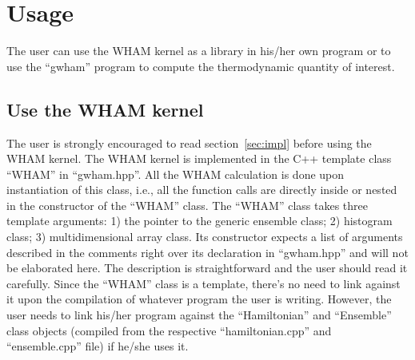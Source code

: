 \section{Usage}
The user can use the WHAM kernel as a library in his/her own
program or to use the ``gwham'' program to compute the thermodynamic
quantity of interest. 

\subsection{Use the WHAM kernel}
The user is strongly encouraged to read section~\ref{sec:impl} before using the
WHAM kernel. The WHAM kernel is implemented in the C++ template class ``WHAM''
in ``gwham.hpp''. All the WHAM calculation is done upon instantiation of this
class, i.e., all the function calls are directly inside or nested in the
constructor of the ``WHAM'' class. The ``WHAM'' class takes three template
arguments: 1) the pointer to the generic ensemble class; 2) histogram class; 3)
multidimensional array class. Its constructor expects a list of arguments
described in the comments right over its declaration in ``gwham.hpp'' and will
not be elaborated here. The description is straightforward and the user should
read it carefully. Since the ``WHAM'' class is a template, there's no need to 
link against it upon the compilation of whatever program the user is writing. 
However, the user needs to link his/her program against the ``Hamiltonian'' 
and ``Ensemble'' class objects (compiled from the respective ``hamiltonian.cpp''
and ``ensemble.cpp'' file) if he/she uses it.
